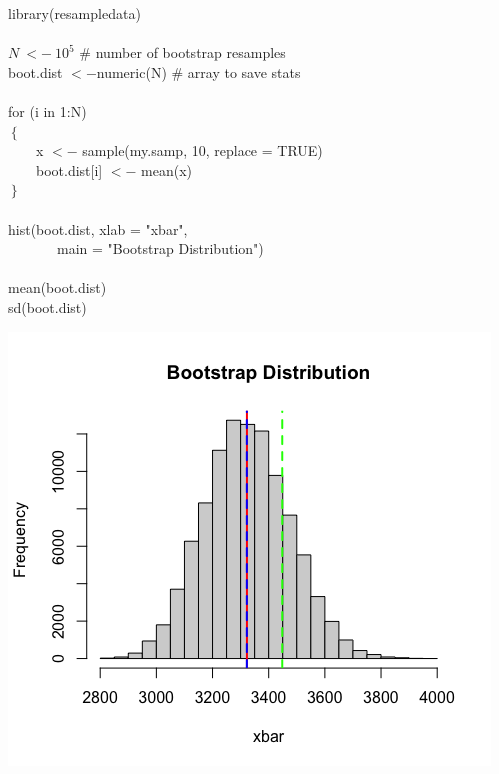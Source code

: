 \begin{multicols}{2}
library(resampledata) \\
\\
$N \ <- \ 10^5$ \# number of bootstrap resamples\\
boot.dist $<-$numeric(N) \# array to save stats\\
\\
for (i in 1:N)\\
$\left\{ \right.$\\
\indent \ \ \ \  x $<-$ sample(my.samp, 10, replace = TRUE)\\
\indent \ \ \ \ boot.dist[i] $<-$ mean(x) \\
$\left. \right\}$\\
\\
hist(boot.dist,  xlab = "xbar", \\
\indent  \ \ \ \ \ \ \ main = "Bootstrap Distribution")\\
\\
mean(boot.dist)\\ %
sd(boot.dist)\\ %

\columnbreak

\begin{center}
\includegraphics[width=0.5\tw]{11/fig-ncbirths2.png}
\end{center}


\end{multicols}
